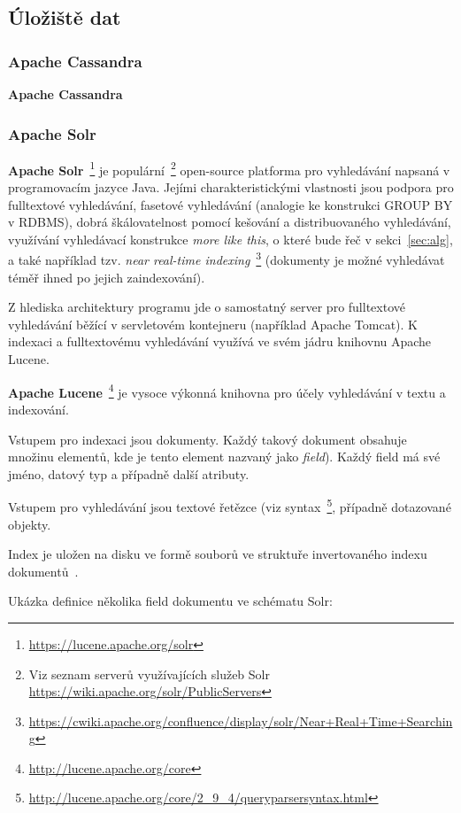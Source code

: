 \documentclass[thesis=M,czech]{FITthesis}[2014/05/07]
\begin{document}
\subsection{Úložiště dat}

\subsubsection{Apache Cassandra}
\textbf{Apache Cassandra}


\subsubsection{Apache Solr}
\textbf{Apache Solr}~\footnote{\url{https://lucene.apache.org/solr}} je populární~\footnote{Viz seznam serverů využívajících služeb Solr \url{https://wiki.apache.org/solr/PublicServers}} open-source platforma pro vyhledávání napsaná v programovacím jazyce Java. Jejími charakteristickými vlastnosti jsou podpora pro fulltextové vyhledávání, fasetové vyhledávání (analogie ke konstrukci GROUP BY v RDBMS), dobrá škálovatelnost pomocí kešování a distribuovaného vyhledávání, využívání vyhledávací konstrukce \emph{more like this}, o které bude řeč v sekci~\ref{sec:alg}, a také například tzv. \emph{near real-time indexing}~\footnote{\url{https://cwiki.apache.org/confluence/display/solr/Near+Real+Time+Searching}} (dokumenty je možné vyhledávat téměř ihned po jejich zaindexování).

Z hlediska architektury programu jde o samostatný server pro fulltextové vyhledávání běžící v servletovém kontejneru (například Apache Tomcat). K indexaci a fulltextovému vyhledávání využívá ve svém jádru knihovnu Apache Lucene. 

\textbf{Apache Lucene}~\footnote{\url{http://lucene.apache.org/core}} je vysoce výkonná knihovna pro účely vyhledávání v textu a indexování.

Vstupem pro indexaci jsou dokumenty. Každý takový dokument obsahuje množinu elementů, kde je tento element nazvaný jako \emph{field}). Každý field má své jméno, datový typ a případně další atributy.

Vstupem pro vyhledávání jsou textové řetězce (viz syntax~\footnote{\url{http://lucene.apache.org/core/2_9_4/queryparsersyntax.html}}, případně dotazované objekty.

Index je uložen na disku ve formě souborů ve struktuře invertovaného indexu dokumentů~\cite{wiki:invindex}.

Ukázka definice několika field dokumentu ve schématu Solr:
\end{document}
